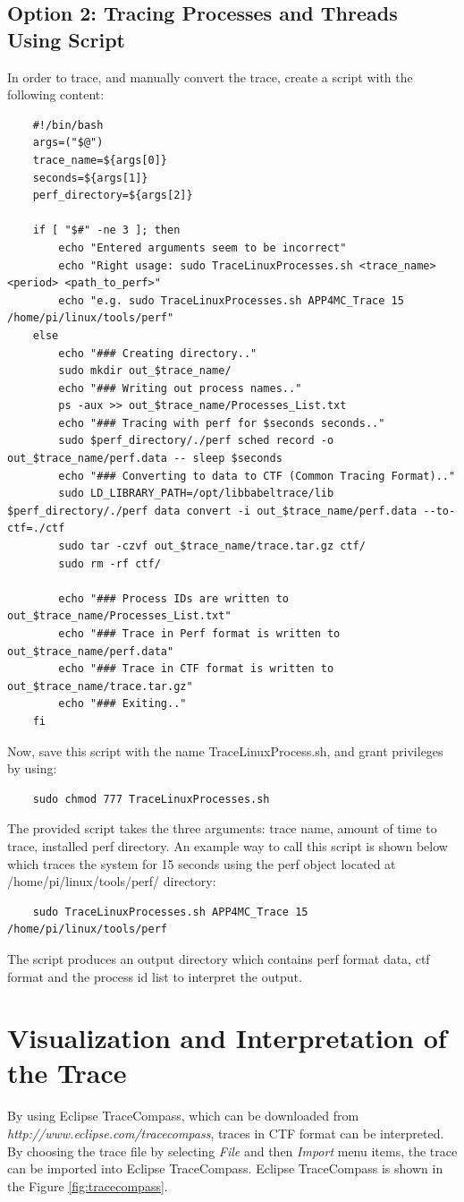 \subsection{Option 2: Tracing Processes and Threads Using Script}
In order to trace, and manually convert the trace, create a script with the following content:
\begin{lstlisting}
	#!/bin/bash
	args=("$@")
	trace_name=${args[0]}
	seconds=${args[1]}
	perf_directory=${args[2]}
	
	if [ "$#" -ne 3 ]; then
		echo "Entered arguments seem to be incorrect"
		echo "Right usage: sudo TraceLinuxProcesses.sh <trace_name> <period> <path_to_perf>"
		echo "e.g. sudo TraceLinuxProcesses.sh APP4MC_Trace 15 /home/pi/linux/tools/perf"
	else
		echo "### Creating directory.."
		sudo mkdir out_$trace_name/
		echo "### Writing out process names.."
		ps -aux >> out_$trace_name/Processes_List.txt
		echo "### Tracing with perf for $seconds seconds.."
		sudo $perf_directory/./perf sched record -o out_$trace_name/perf.data -- sleep $seconds
		echo "### Converting to data to CTF (Common Tracing Format).."
		sudo LD_LIBRARY_PATH=/opt/libbabeltrace/lib $perf_directory/./perf data convert -i out_$trace_name/perf.data --to-ctf=./ctf
		sudo tar -czvf out_$trace_name/trace.tar.gz ctf/
		sudo rm -rf ctf/
		
		echo "### Process IDs are written to out_$trace_name/Processes_List.txt"
		echo "### Trace in Perf format is written to out_$trace_name/perf.data"
		echo "### Trace in CTF format is written to out_$trace_name/trace.tar.gz"
		echo "### Exiting.."
	fi
\end{lstlisting}
Now, save this script with the name TraceLinuxProcess.sh, and grant privileges by using:
\begin{lstlisting}
	sudo chmod 777 TraceLinuxProcesses.sh
\end{lstlisting}
The provided script takes the three arguments: trace name, amount of time to trace, installed perf directory. An example way to call this script is shown below which traces the system for 15 seconds using the perf object located at /home/pi/linux/tools/perf/ directory:
\begin{lstlisting}
	sudo TraceLinuxProcesses.sh APP4MC_Trace 15 /home/pi/linux/tools/perf
\end{lstlisting}
The script produces an output directory which contains perf format data, ctf format and the process id list to interpret the output. 

\section{Visualization and Interpretation of the Trace}
By using Eclipse TraceCompass, which can be downloaded from \textit{http://www.eclipse.com/tracecompass}, traces in CTF format can be interpreted. By choosing the trace file by selecting \textit{File} and then \textit{Import} menu items, the trace can be imported into Eclipse TraceCompass. Eclipse TraceCompass is shown in the Figure \ref{fig:tracecompass}.

